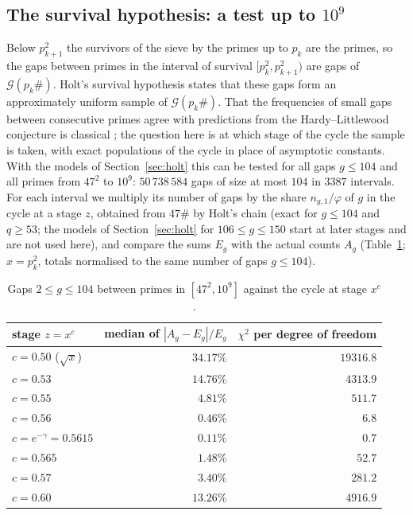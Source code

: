 \documentclass[11pt]{article}
\theoremstyle{definition}
\theoremstyle{remark}
\newcommand{\G}{\mathcal{G}}
\begin{document}
\subsection{The survival hypothesis: a test up to \texorpdfstring{$10^9$}{10\^{}9}}\label{sec:survival}
Below $p_{k+1}^2$ the survivors of the sieve by the primes up to $p_k$ are the primes, so the gaps between primes in the interval of survival $[p_k^2, p_{k+1}^2)$ are gaps of $\G(p_k\#)$. Holt's survival hypothesis \cite[Conj.~2.1]{Ho26b} states that these gaps form an approximately uniform sample of $\G(p_k\#)$. That the frequencies of small gaps between consecutive primes agree with predictions from the Hardy--Littlewood conjecture is classical \cite{Br74, Wo11}; the question here is at which stage of the cycle the sample is taken, with exact populations of the cycle in place of asymptotic constants. With the models of Section~\ref{sec:holt} this can be tested for all gaps $g \le 104$ and all primes from $47^2$ to $10^9$: $50\,738\,584$ gaps of size at most $104$ in $3387$ intervals. For each interval we multiply its number of gaps by the share $n_{g,1}/\varphi$ of $g$ in the cycle at a stage $z$, obtained from $47\#$ by Holt's chain (exact for $g \le 104$ and $q \ge 53$; the models of Section~\ref{sec:holt} for $106 \le g \le 150$ start at later stages and are not used here), and compare the sums $E_g$ with the actual counts $A_g$ (Table~\ref{tab:survival}; $x = p_k^2$, totals normalised to the same number of gaps $g \le 104$).

\begin{table}[ht]
\centering
\begin{tabular}{lrr}
\toprule
stage $z = x^c$ & median of $|A_g - E_g|/E_g$ & $\chi^2$ per degree of freedom \\
\midrule
$c = 0.50$ ($\sqrt{x}$) & $34.17\%$ & $19316.8$ \\
$c = 0.53$ & $14.76\%$ & $4313.9$ \\
$c = 0.55$ & $4.81\%$ & $511.7$ \\
$c = 0.56$ & $0.46\%$ & $6.8$ \\
$c = e^{-\gamma} = 0.5615$ & $0.11\%$ & $0.7$ \\
$c = 0.565$ & $1.48\%$ & $52.7$ \\
$c = 0.57$ & $3.40\%$ & $281.2$ \\
$c = 0.60$ & $13.26\%$ & $4916.9$ \\
\bottomrule
\end{tabular}
\caption{Gaps $2 \le g \le 104$ between primes in $[47^2, 10^9]$ against the cycle at stage $x^c$.}\label{tab:survival}
\end{table}
\end{document}

